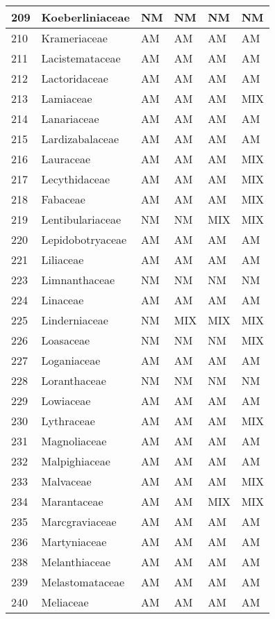 \documentclass[]{article}
\begin{document}
\begin{longtable}{l|l|l|l|l|l}
\hline
209 & Koeberliniaceae & NM & NM & NM & NM\\
\hline
210 & Krameriaceae & AM & AM & AM & AM\\
\hline
211 & Lacistemataceae & AM & AM & AM & AM\\
\hline
212 & Lactoridaceae & AM & AM & AM & AM\\
\hline
213 & Lamiaceae & AM & AM & AM & MIX\\
\hline
214 & Lanariaceae & AM & AM & AM & AM\\
\hline
215 & Lardizabalaceae & AM & AM & AM & AM\\
\hline
216 & Lauraceae & AM & AM & AM & MIX\\
\hline
217 & Lecythidaceae & AM & AM & AM & MIX\\
\hline
218 & Fabaceae & AM & AM & AM & MIX\\
\hline
219 & Lentibulariaceae & NM & NM & MIX & MIX\\
\hline
220 & Lepidobotryaceae & AM & AM & AM & AM\\
\hline
221 & Liliaceae & AM & AM & AM & AM\\
\hline
223 & Limnanthaceae & NM & NM & NM & NM\\
\hline
224 & Linaceae & AM & AM & AM & AM\\
\hline
225 & Linderniaceae & NM & MIX & MIX & MIX\\
\hline
226 & Loasaceae & NM & NM & NM & MIX\\
\hline
227 & Loganiaceae & AM & AM & AM & AM\\
\hline
228 & Loranthaceae & NM & NM & NM & NM\\
\hline
229 & Lowiaceae & AM & AM & AM & AM\\
\hline
230 & Lythraceae & AM & AM & AM & MIX\\
\hline
231 & Magnoliaceae & AM & AM & AM & AM\\
\hline
232 & Malpighiaceae & AM & AM & AM & AM\\
\hline
233 & Malvaceae & AM & AM & AM & MIX\\
\hline
234 & Marantaceae & AM & AM & MIX & MIX\\
\hline
235 & Marcgraviaceae & AM & AM & AM & AM\\
\hline
236 & Martyniaceae & AM & AM & AM & AM\\
\hline
238 & Melanthiaceae & AM & AM & AM & AM\\
\hline
239 & Melastomataceae & AM & AM & AM & AM\\
\hline
240 & Meliaceae & AM & AM & AM & AM\\

\end{longtable}
\end{document}
